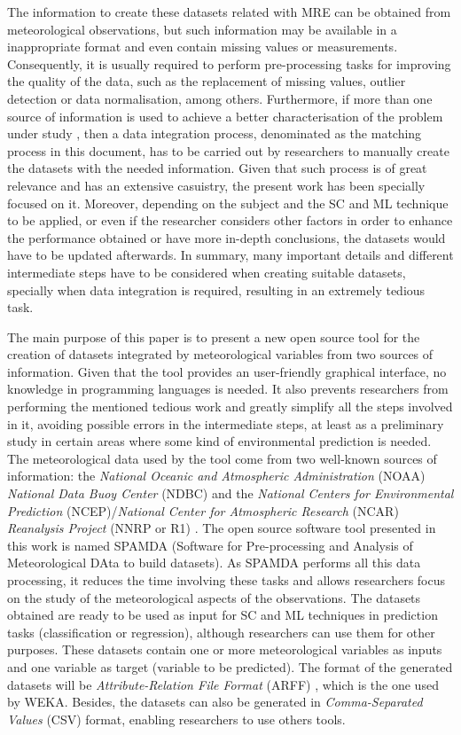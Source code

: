 \documentclass[energies,article,submit,moreauthors,pdftex]{Definitions/mdpi}
\begin{document}
		The information to create these datasets related with MRE can be obtained from meteorological observations, but such information may be available in a inappropriate format and even contain missing values or measurements. Consequently, it is usually required to perform pre-processing tasks for improving the quality of the data, such as the replacement of missing values, outlier detection or data normalisation, among others. Furthermore, if more than one source of information is used to achieve a better characterisation of the problem under study \cite{JOHANSSON2015143, FERNANDEZ201544, Adams2010}, then a data integration process, denominated as the matching process in this document, has to be carried out by researchers to manually create the datasets with the needed information. Given that such process is of great relevance and has an extensive casuistry, the present work has been specially focused on it. Moreover, depending on the subject and the SC and ML technique to be applied, or even if the researcher considers other factors in order to enhance the performance obtained or have more in-depth conclusions, the datasets would have to be updated afterwards. In summary, many important details and different intermediate steps have to be considered when creating suitable datasets, specially when data integration is required, resulting in an extremely tedious task.
		
		The main purpose of this paper is to present a new open source tool for the creation of datasets integrated by meteorological variables from two sources of information. Given that the tool provides an user-friendly graphical interface, no knowledge in programming languages is needed. It also prevents researchers from performing the mentioned tedious work and greatly simplify all the steps involved in it, avoiding possible errors in the intermediate steps, at least as a preliminary study in certain areas where some kind of environmental prediction is needed. The meteorological data used by the tool come from two well-known sources of information: the \textit{National Oceanic and Atmospheric Administration} (NOAA) \textit{National Data Buoy Center} (NDBC) \cite{NOAA} and the \textit{National Centers for Environmental Prediction} (NCEP)/\textit{National Center for Atmospheric Research} (NCAR) \textit{Reanalysis Project} (NNRP or R1) \cite{Kalnay1996, Kistler2001}. The open source software tool presented in this work is named SPAMDA (Software for Pre-processing and Analysis of Meteorological DAta to build datasets). As SPAMDA performs all this data processing, it reduces the time involving these tasks and allows researchers focus on the study of the meteorological aspects of the observations. The datasets obtained are ready to be used as input for SC and ML techniques in prediction tasks (classification or regression), although researchers can use them for other purposes. These datasets contain one or more meteorological variables as inputs and one variable as target (variable to be predicted). The format of the generated datasets will be \textit{Attribute-Relation File Format} (ARFF) \cite{WEKA_ARFF}, which is the one used by WEKA. Besides, the datasets can also be generated in \textit{Comma-Separated Values} (CSV) format, enabling researchers to use others tools.
		
\end{document}
